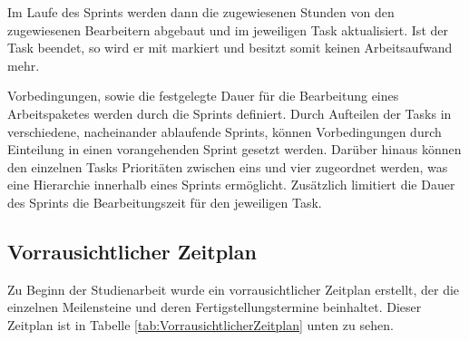 Im Laufe des Sprints werden dann die zugewiesenen Stunden von den zugewiesenen Bearbeitern abgebaut und im jeweiligen Task aktualisiert.
Ist der Task beendet, so wird er mit  markiert und besitzt somit keinen Arbeitsaufwand mehr.

Vorbedingungen, sowie die festgelegte Dauer für die Bearbeitung eines Arbeitspaketes werden durch die Sprints definiert. 
Durch Aufteilen der Tasks in verschiedene, nacheinander ablaufende Sprints, können Vorbedingungen durch Einteilung in einen vorangehenden Sprint gesetzt werden.
Darüber hinaus können den einzelnen Tasks Prioritäten zwischen eins und vier zugeordnet werden, was eine Hierarchie innerhalb eines Sprints ermöglicht.
Zusätzlich limitiert die Dauer des Sprints die Bearbeitungszeit für den jeweiligen Task.

\newpage
\subsection{Vorrausichtlicher Zeitplan}
Zu Beginn der Studienarbeit wurde ein vorrausichtlicher Zeitplan erstellt, der die einzelnen Meilensteine und deren Fertigstellungstermine beinhaltet. Dieser Zeitplan ist in Tabelle \ref{tab:VorrausichtlicherZeitplan} unten zu sehen.
